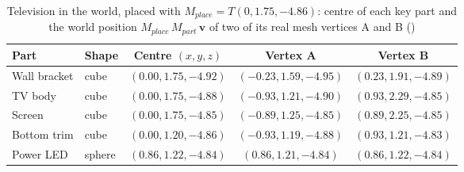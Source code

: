 \begin{table}[H]\centering\footnotesize
\caption{Television in the world, placed with $M_{place}=T(0, 1.75, -4.86)$: centre of each key part and the world position $M_{place}\,M_{part}\,\mathbf{v}$ of two of its real mesh vertices A and B ()}\label{tab:world_tv}
\begin{tabular}{@{}l l c c c@{}}
\toprule
Part & Shape & Centre $(x,y,z)$ & Vertex A & Vertex B \\
\midrule
Wall bracket & cube & $(0.00, 1.75, -4.92)$ & $(-0.23, 1.59, -4.95)$ & $(0.23, 1.91, -4.89)$ \\
TV body & cube & $(0.00, 1.75, -4.88)$ & $(-0.93, 1.21, -4.90)$ & $(0.93, 2.29, -4.85)$ \\
Screen & cube & $(0.00, 1.75, -4.85)$ & $(-0.89, 1.25, -4.85)$ & $(0.89, 2.25, -4.85)$ \\
Bottom trim & cube & $(0.00, 1.20, -4.86)$ & $(-0.93, 1.19, -4.88)$ & $(0.93, 1.21, -4.83)$ \\
Power LED & sphere & $(0.86, 1.22, -4.84)$ & $(0.86, 1.21, -4.84)$ & $(0.86, 1.22, -4.84)$ \\
\bottomrule
\end{tabular}
\end{table}
